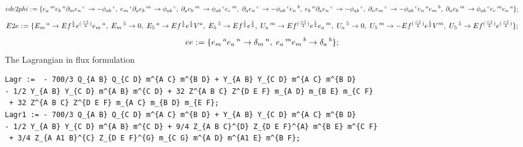 \documentclass[11pt]{article}
\def\specialcolon{\mathrel{\mathop{:}}\hspace{-.5em}}
\begin{document}
\begin{dmath*}[compact, spread=2pt]
ede2phi\specialcolon{}= \{{e}_{a}\,^{m} {e}_{b}\,^{n} {\partial}_{m}{{e}_{n}\,^{c}}\,  \rightarrow -{\phi}_{a b}\,^{c},\; {e}_{m}\,^{c} {\partial}_{a}{{e}_{b}\,^{m}}\,  \rightarrow {\phi}_{a b}\,^{c},\; {\partial}_{a}{{e}_{b}\,^{m}}\,  \rightarrow {\phi}_{a b}\,^{c} {e}_{c}\,^{m},\; {\partial}_{a}{{e}_{n}\,^{c}}\,  \rightarrow -{\phi}_{a b}\,^{c} {e}_{n}\,^{b},\; {e}_{b}\,^{n} {\partial}_{a}{{e}_{n}\,^{c}}\,  \rightarrow -{\phi}_{a b}\,^{c},\; {\partial}_{n}{{e}_{m}\,^{c}}\,  \rightarrow -{\phi}_{a b}\,^{c} {e}_{n}\,^{a} {e}_{m}\,^{b},\; {\partial}_{n}{{e}_{b}\,^{m}}\,  \rightarrow {\phi}_{a b}\,^{c} {e}_{c}\,^{m} {e}_{n}\,^{a}\};
\end{dmath*}
\begin{dmath*}[compact, spread=2pt]
E2e\specialcolon{}= \{{E}_{m}\,^{a} \rightarrow Ef{}^{\frac{1}{2}} e{}^{(\frac{-1}{2})} {e}_{m}\,^{a},\; {E}_{m}\,^{5} \rightarrow 0,\; {E}_{5}\,^{a} \rightarrow Ef{}^{\frac{1}{2}} e{}^{\frac{1}{2}} {V}^{a},\; {E}_{5}\,^{5} \rightarrow Ef{}^{\frac{1}{2}} e{}^{\frac{1}{2}},\; {U}_{a}\,^{m} \rightarrow Ef{}^{(\frac{-1}{2})} e{}^{\frac{1}{2}} {e}_{a}\,^{m},\; {U}_{a}\,^{5} \rightarrow 0,\; {U}_{5}\,^{m} \rightarrow -Ef{}^{(\frac{-1}{2})} e{}^{\frac{1}{2}} {V}^{m},\; {U}_{5}\,^{5} \rightarrow Ef{}^{(\frac{-1}{2})} e{}^{(\frac{-1}{2})}\};
\end{dmath*}
\begin{dmath*}[compact, spread=2pt]
ee\specialcolon{}= \{{e}_{m}\,^{a} {e}_{a}\,^{n} \rightarrow {\delta}_{m}\,^{n},\; {e}_{a}\,^{m} {e}_{m}\,^{b} \rightarrow {\delta}_{a}\,^{b}\};
\end{dmath*}
The Lagrangian in flux formulation
{\color[named]{Blue}\begin{verbatim}
Lagr :=  - 700/3 Q_{A B} Q_{C D} m^{A C} m^{B D} + Y_{A B} Y_{C D} m^{A C} m^{B D} 
- 1/2 Y_{A B} Y_{C D} m^{A B} m^{C D} + 32 Z^{A B C} Z^{D E F} m_{A D} m_{B E} m_{C F}
 + 32 Z^{A B C} Z^{D E F} m_{A C} m_{B D} m_{E F};
Lagr1 := - 700/3 Q_{A B} Q_{C D} m^{A C} m^{B D} + Y_{A B} Y_{C D} m^{A C} m^{B D} 
- 1/2 Y_{A B} Y_{C D} m^{A B} m^{C D} + 9/4 Z_{A B C}^{D} Z_{D E F}^{A} m^{B E} m^{C F}
 + 3/4 Z_{A A1 B}^{C} Z_{D E F}^{G} m_{C G} m^{A D} m^{A1 E} m^{B F};
\end{verbatim}}
\end{document}

